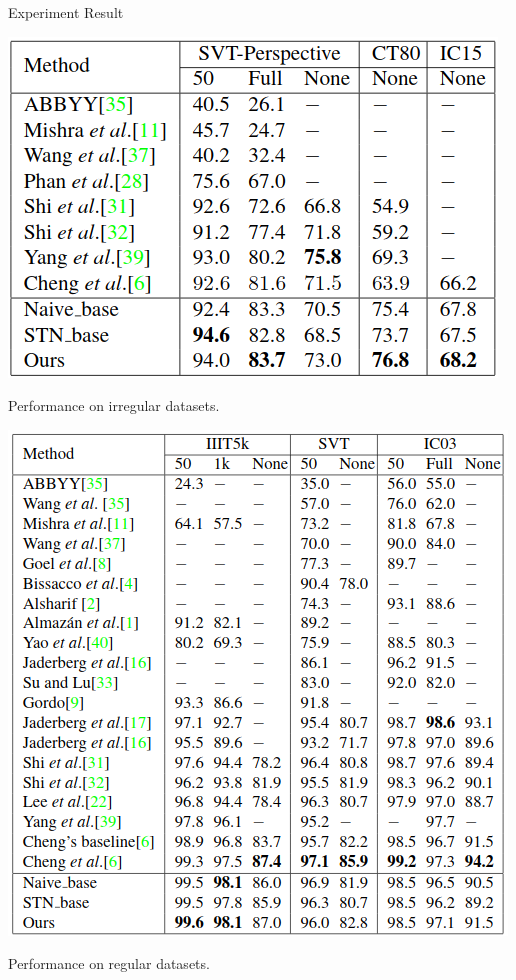 \documentclass[compress]{beamer}
\begin{document}
\begin{frame}[allowframebreaks]{Experiment Result}
    \begin{table}
        \includegraphics[height=.5\textheight]{pfirregular}
        \caption{Performance on irregular datasets.}
    \end{table}
    \begin{table}
        \includegraphics[height=.78\textheight]{pfregular}
        \caption{Performance on regular datasets.}
    \end{table}
\end{frame}
\end{document}
